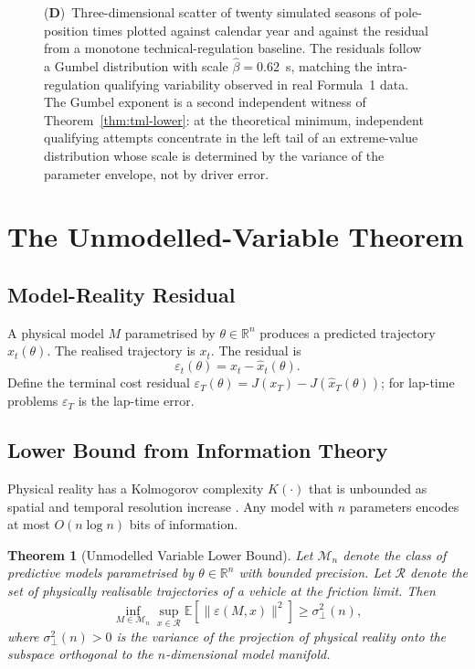 \documentclass[11pt,twocolumn]{article}
\newtheorem{theorem}{Theorem}
\theoremstyle{definition}
\theoremstyle{remark}
\newcommand{\R}{\mathbb{R}}
\newcommand{\E}{\mathbb{E}}
\providecommand{\cM}{\mathcal{M}}
\providecommand{\cR}{\mathcal{R}}
\begin{document}
\begin{figure}[!htbp]
{    (\textbf{D})~Three-dimensional scatter of twenty simulated seasons of pole-position times plotted against calendar year and against the residual from a monotone technical-regulation baseline. The residuals follow a Gumbel distribution with scale $\hat\beta = 0.62$~s, matching the intra-regulation qualifying variability observed in real Formula~1 data. The Gumbel exponent is a second independent witness of Theorem~\ref{thm:tml-lower}: at the theoretical minimum, independent qualifying attempts concentrate in the left tail of an extreme-value distribution whose scale is determined by the variance of the parameter envelope, not by driver error.}
    \label{fig:panel3}
\end{figure}

\section{The Unmodelled-Variable Theorem}
\label{sec:unmodelled}

\subsection{Model-Reality Residual}

A physical model $M$ parametrised by $\theta \in \R^n$ produces a predicted trajectory $\hat x_t(\theta)$. The realised trajectory is $x_t$. The residual is
\begin{equation}
\varepsilon_t(\theta) = x_t - \hat x_t(\theta).
\end{equation}
Define the terminal cost residual $\varepsilon_T(\theta) = J(x_T) - J(\hat x_T(\theta))$; for lap-time problems $\varepsilon_T$ is the lap-time error.

\subsection{Lower Bound from Information Theory}

Physical reality has a Kolmogorov complexity $K(\cdot)$ that is unbounded as spatial and temporal resolution increase \cite{liming2013kolmogorov}. Any model with $n$ parameters encodes at most $O(n \log n)$ bits of information.

\begin{theorem}[Unmodelled Variable Lower Bound]\label{thm:unmodelled}
Let $\cM_n$ denote the class of predictive models parametrised by $\theta \in \R^n$ with bounded precision. Let $\cR$ denote the set of physically realisable trajectories of a vehicle at the friction limit. Then
\begin{equation}
\inf_{M \in \cM_n} \sup_{x \in \cR} \E[\|\varepsilon(M, x)\|^2] \ge \sigma^2_{\perp}(n),
\end{equation}
where $\sigma^2_{\perp}(n) > 0$ is the variance of the projection of physical reality onto the subspace orthogonal to the $n$-dimensional model manifold.
\end{theorem}
\end{document}
